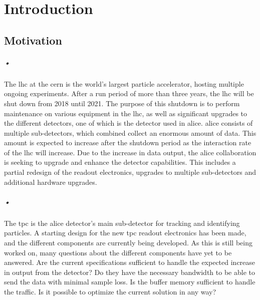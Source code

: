 \documentclass[a4paper, 12pt]{report}
\begin{document}

\pagestyle{fancy}
\chapter{Introduction}

\section{Motivation}
\label{sec:motivation}
\paragraph{•}
The \gls{lhc} at the \gls{cern} is the world's largest particle accelerator, hosting multiple ongoing experiments.
After a run period of more than three years, the \gls{lhc} will be shut down from 2018 until 2021\cite{ls2}.
The purpose of this shutdown is to perform maintenance on various equipment in the \gls{lhc}, as well as significant upgrades to the different detectors, one of which is the detector used in \gls{alice}.
\gls{alice} consists of multiple sub-detectors, which combined collect an enormous amount of data.
This amount is expected to increase after the shutdown period as the interaction rate of the \gls{lhc} will increase.
Due to the increase in data output, the \gls{alice} collaboration is seeking to upgrade and enhance the detector capabilities\cite{alice-upgrade}.
This includes a partial redesign of the readout electronics, upgrades to multiple sub-detectors and additional hardware upgrades.

\paragraph{•}
The \gls{tpc} is the \gls{alice} detector's main sub-detector for tracking and identifying particles.
A starting design for the new \gls{tpc} readout electronics has been made, and the different components are currently being developed.
As this is still being worked on, many questions about the different components have yet to be answered.
Are the current specifications sufficient to handle the expected increase in output from the detector?
Do they have the necessary bandwidth to be able to send the data with minimal sample loss.
Is the buffer memory sufficient to handle the traffic.
Is it possible to optimize the current solution in any way?
\end{document}
